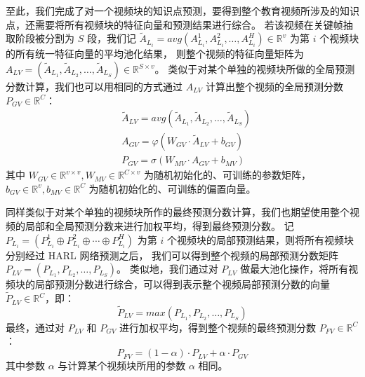     至此，我们完成了对一个视频块的知识点预测，要得到整个教育视频所涉及的知识点，还需要将所有视频块的特征向量和预测结果进行综合。
    若该视频在关键帧抽取阶段被分割为 $S$ 段，我们记 $\tilde{A}_{L_i} = avg\left(A_{L_i}^1, A_{L_i}^2, \dots, A_{L_i}^H\right) \in \mathbb{R}^{v}$ 为第 $i$ 个视频块的所有统一特征向量的平均池化结果，
    则整个视频的特征向量矩阵为 $A_{LV} = \left(\tilde{A}_{L_1}, \tilde{A}_{L_2}, \dots, \tilde{A}_{L_S}\right) \in \mathbb{R}^{S \times v}$。
    类似于对某个单独的视频块所做的全局预测分数计算，我们也可以用相同的方式通过 $A_{LV}$ 计算出整个视频的全局预测分数 $P_{GV} \in \mathbb{R}^{C}$：
    \begin{equation}
        \begin{aligned}
            &\tilde{A}_{LV} = avg\left(\tilde{A}_{L_1}, \tilde{A}_{L_2}, \dots, \tilde{A}_{L_S}\right) \\
            &A_{GV} = \varphi\left(W_{GV} \cdot \tilde{A}_{LV} + b_{GV}\right) \\
            &P_{GV} = \sigma\left(W_{MV} \cdot A_{GV} + b_{MV}\right)
        \end{aligned}
    \end{equation}
    其中 $W_{GV} \in \mathbb{R}^{v \times v}, W_{MV} \in \mathbb{R}^{C \times v}$ 为随机初始化的、可训练的参数矩阵，
    $b_{GV} \in \mathbb{R}^{v}, b_{MV} \in \mathbb{R}^{C}$ 为随机初始化的、可训练的偏置向量。

    同样类似于对某个单独的视频块所作的最终预测分数计算，我们也期望使用整个视频的局部和全局预测分数来进行加权平均，得到最终预测分数。
    记 $P_{L_i} = \left(P_{L_i}^1 \oplus P_{L_i}^2 \oplus \cdots \oplus P_{L_i}^H\right)$ 为第 $i$ 个视频块的局部预测结果，则将所有视频块分别经过 HARL 网络预测之后，
    我们可以得到整个视频的局部预测分数矩阵 $P_{LV} = \left(P_{L_1}, P_{L_2}, \dots, P_{L_S}\right)$。
    类似地，我们通过对 $P_{LV}$ 做最大池化操作，将所有视频块的局部预测分数进行综合，可以得到表示整个视频局部预测分数的向量 $\tilde{P}_{LV} \in \mathbb{R}^{C}$，即：
    \begin{equation}
        \tilde{P}_{LV} = max\left(P_{L_1}, P_{L_2}, \dots, P_{L_S}\right)
    \end{equation}
    最终，通过对 $P_{LV}$ 和 $P_{GV}$ 进行加权平均，得到整个视频的最终预测分数 $P_{FV} \in \mathbb{R}^{C}$：
    \begin{equation}
        P_{FV} = (1 - \alpha) \cdot P_{LV} + \alpha \cdot P_{GV}
    \end{equation}
    其中参数 $\alpha$ 与计算某个视频块所用的参数 $\alpha$ 相同。


